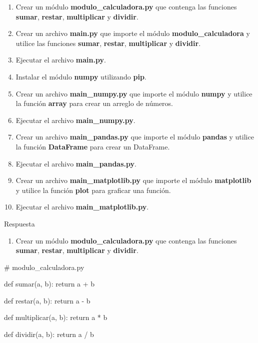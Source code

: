 \documentclass[
  a4paper,
  DIV=11,
  numbers=noendperiod,
  onepage,
  openany]{scrreprt}
\newenvironment{Shaded}{\begin{snugshade}}{\end{snugshade}}
\newcommand{\CommentTok}[1]{\textcolor[rgb]{0.37,0.37,0.37}{#1}}
\newcommand{\ControlFlowTok}[1]{\textcolor[rgb]{0.00,0.23,0.31}{#1}}
\newcommand{\KeywordTok}[1]{\textcolor[rgb]{0.00,0.23,0.31}{#1}}
\newcommand{\NormalTok}[1]{\textcolor[rgb]{0.00,0.23,0.31}{#1}}
\newcommand{\OperatorTok}[1]{\textcolor[rgb]{0.37,0.37,0.37}{#1}}
\providecommand{\tightlist}{%
  \setlength{\itemsep}{0pt}\setlength{\parskip}{0pt}}\usepackage{longtable,booktabs,array}
\begin{document}
\begin{enumerate}
\def\labelenumi{\arabic{enumi}.}
\item
  Crear un módulo \textbf{modulo\_calculadora.py} que contenga las
  funciones \textbf{sumar}, \textbf{restar}, \textbf{multiplicar} y
  \textbf{dividir}.
\item
  Crear un archivo \textbf{main.py} que importe el módulo
  \textbf{modulo\_calculadora} y utilice las funciones \textbf{sumar},
  \textbf{restar}, \textbf{multiplicar} y \textbf{dividir}.
\item
  Ejecutar el archivo \textbf{main.py}.
\item
  Instalar el módulo \textbf{numpy} utilizando \textbf{pip}.
\item
  Crear un archivo \textbf{main\_numpy.py} que importe el módulo
  \textbf{numpy} y utilice la función \textbf{array} para crear un
  arreglo de números.
\item
  Ejecutar el archivo \textbf{main\_numpy.py}.
\item
  Crear un archivo \textbf{main\_pandas.py} que importe el módulo
  \textbf{pandas} y utilice la función \textbf{DataFrame} para crear un
  DataFrame.
\item
  Ejecutar el archivo \textbf{main\_pandas.py}.
\item
  Crear un archivo \textbf{main\_matplotlib.py} que importe el módulo
  \textbf{matplotlib} y utilice la función \textbf{plot} para graficar
  una función.
\item
  Ejecutar el archivo \textbf{main\_matplotlib.py}.
\end{enumerate}

Respuesta

\begin{enumerate}
\def\labelenumi{\arabic{enumi}.}
\tightlist
\item
  Crear un módulo \textbf{modulo\_calculadora.py} que contenga las
  funciones \textbf{sumar}, \textbf{restar}, \textbf{multiplicar} y
  \textbf{dividir}.
\end{enumerate}

\begin{Shaded}
\begin{Highlighting}[]
\CommentTok{\# modulo\_calculadora.py}

\KeywordTok{def}\NormalTok{ sumar(a, b):}
    \ControlFlowTok{return}\NormalTok{ a }\OperatorTok{+}\NormalTok{ b}

\KeywordTok{def}\NormalTok{ restar(a, b):}
    \ControlFlowTok{return}\NormalTok{ a }\OperatorTok{{-}}\NormalTok{ b}

\KeywordTok{def}\NormalTok{ multiplicar(a, b):}
    \ControlFlowTok{return}\NormalTok{ a }\OperatorTok{*}\NormalTok{ b}

\KeywordTok{def}\NormalTok{ dividir(a, b):}
    \ControlFlowTok{return}\NormalTok{ a }\OperatorTok{/}\NormalTok{ b}
\end{Highlighting}
\end{Shaded}
\end{document}
